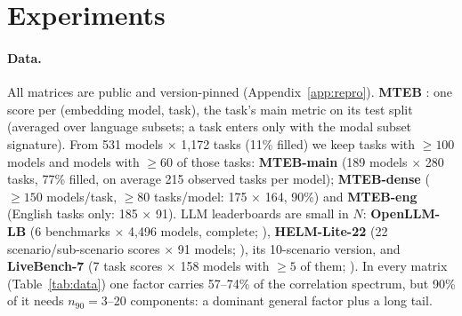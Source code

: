 \section{Experiments}
\label{sec:exp}

\paragraph{Data.}
All matrices are public and version-pinned (Appendix~\ref{app:repro}). \textbf{MTEB} \citep{muennighoff2022mteb,mtebresults}: one score per (embedding model, task), the task's main metric on its test split (averaged over language subsets; a task enters only with the modal subset signature). From 531 models $\times$ 1,172 tasks (11\% filled) we keep tasks with $\ge100$ models and models with $\ge60$ of those tasks: \textbf{MTEB-main} (189 models $\times$ 280 tasks, 77\% filled, on average 215 observed tasks per model); \textbf{MTEB-dense} ($\ge150$ models/task, $\ge80$ tasks/model: 175 $\times$ 164, 90\%) and \textbf{MTEB-eng} (English tasks only: 185 $\times$ 91). LLM leaderboards are small in $N$: \textbf{OpenLLM-LB} (6 benchmarks $\times$ 4,496 models, complete; \citealp{openllm2024}), \textbf{HELM-Lite-22} (22 scenario/sub-scenario scores $\times$ 91 models; \citealp{helmlite,liang2022helm}), its 10-scenario version, and \textbf{LiveBench-7} (7 task scores $\times$ 158 models with $\ge5$ of them; \citealp{white2024livebench}). In every matrix (Table~\ref{tab:data}) one factor carries 57--74\% of the correlation spectrum, but 90\% of it needs $n_{90}=3$--20 components: a dominant general factor plus a long tail.

\begin{table}[t]
\centering\small
\caption{Matrices. $\lambda_1/N$: top eigenvalue share of the pairwise correlation matrix; PR: participation ratio; $n_{90}$: components for 90\% of the spectrum; $\rho$: off-diagonal correlation.}
\label{tab:data}

\end{table}


